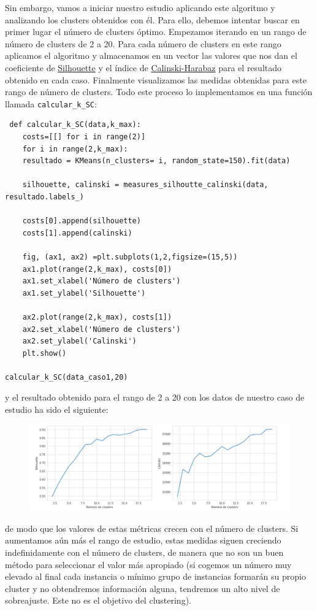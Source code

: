 \documentclass[a4paper,11pt]{book}
\begin{document}
Sin embargo, vamos a iniciar nuestro estudio aplicando este algoritmo y analizando los clusters obtenidos con él. Para ello, debemos intentar buscar en primer lugar el número de clusters óptimo. Empezamos iterando en un rango de número de clusters de 2 a 20. Para cada número de clusters en este rango aplicamos el algoritmo y almacenamos en un vector las valores que nos dan el coeficiente de \underline{Silhouette} y el índice de \underline{Calinski-Harabaz} para el resultado obtenido en cada caso. Finalmente visualizamos las medidas obtenidas para este rango de número de clusters. Todo este proceso lo implementamos en una función llamada \texttt{calcular_k_SC}:
\begin{verbatim}
 def calcular_k_SC(data,k_max):
	costs=[[] for i in range(2)] 
	for i in range(2,k_max):
	resultado = KMeans(n_clusters= i, random_state=150).fit(data)
	
	silhouette, calinski = measures_silhoutte_calinski(data, resultado.labels_)
	
	costs[0].append(silhouette)
	costs[1].append(calinski)
	
	fig, (ax1, ax2) =plt.subplots(1,2,figsize=(15,5))
	ax1.plot(range(2,k_max), costs[0])
	ax1.set_xlabel('Número de clusters')
	ax1.set_ylabel('Silhouette')
	
	ax2.plot(range(2,k_max), costs[1])
	ax2.set_xlabel('Número de clusters')
	ax2.set_ylabel('Calinski')
	plt.show()
	
calcular_k_SC(data_caso1,20)
\end{verbatim}
y el resultado obtenido para el rango de 2 a 20 con los datos de nuestro caso de estudio ha sido el siguiente:
\begin{figure}[h]
	\centering
	\includegraphics[width=1\linewidth]{img/calcular_sc1}
	\caption{}
	\label{fig:calcularsc1}
\end{figure}

de modo que los valores de estas métricas crecen con el número de clusters. Si aumentamos aún más el rango de estudio, estas medidas siguen creciendo indefinidamente con el número de clusters, de manera que no son un buen método para seleccionar el valor más apropiado (si cogemos un número muy elevado al final cada instancia o mínimo grupo de instancias formarán su propio cluster y no obtendremos información alguna, tendremos un alto nivel de sobreajuste. Este no es el objetivo del clustering).
\end{document}
